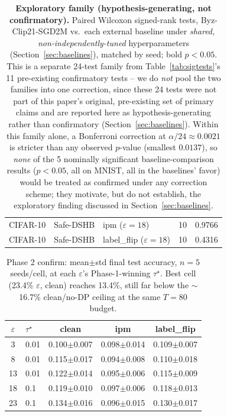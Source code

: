 \documentclass{article}
\begin{document}
\begin{table}[t]
\begin{tabular}{lllcc}
CIFAR-10 & Safe-DSHB & ipm ($\varepsilon{=}18$) & 10 & 0.9766 \\
CIFAR-10 & Safe-DSHB & label\_flip ($\varepsilon{=}18$) & 10 & 0.4316 \\
\bottomrule
\end{tabular}
\caption{\textbf{Exploratory family (hypothesis-generating, not confirmatory).}
Paired Wilcoxon signed-rank tests, Byz-Clip21-SGD2M vs.\ each external
baseline under \emph{shared, non-independently-tuned} hyperparameters
(Section~\ref{sec:baselines}), matched by seed; bold $p{<}0.05$. This is a
separate 24-test family from Table~\ref{tab:sigtests}'s 11 pre-existing
confirmatory tests -- we do \emph{not} pool the two families into one
correction, since these 24 tests were not part of this paper's original,
pre-existing set of primary claims and are reported here as
hypothesis-generating rather than confirmatory (Section~\ref{sec:baselines}).
Within this family alone, a Bonferroni correction at $\alpha/24\approx0.0021$
is stricter than any observed $p$-value (smallest $0.0137$), so \emph{none} of
the 5 nominally significant baseline-comparison results ($p<0.05$, all on
MNIST, all in the baselines' favor) would be treated as confirmed under any
correction scheme; they motivate, but do not establish, the exploratory
finding discussed in Section~\ref{sec:baselines}.}
\label{tab:sigtests-baselines}
\end{table}

\begin{table}[t]
\centering\small
\begin{tabular}{clccc}
\toprule
$\varepsilon$ & $\tau^\star$ & clean & ipm & label\_flip \\
\midrule
3  & 0.01 & 0.100$\pm$0.007 & 0.098$\pm$0.014 & 0.109$\pm$0.007 \\
8  & 0.01 & 0.115$\pm$0.017 & 0.094$\pm$0.008 & 0.110$\pm$0.018 \\
13 & 0.01 & 0.122$\pm$0.014 & 0.095$\pm$0.006 & 0.115$\pm$0.009 \\
18 & 0.1  & 0.119$\pm$0.010 & 0.097$\pm$0.006 & 0.118$\pm$0.013 \\
23 & 0.1  & 0.134$\pm$0.016 & 0.096$\pm$0.015 & 0.130$\pm$0.017 \\
\bottomrule
\end{tabular}
\caption{Phase 2 confirm: mean$\pm$std final test accuracy, $n{=}5$ seeds/cell,
at each $\varepsilon$'s Phase-1-winning $\tau^\star$. Best cell (23.4\%
$\varepsilon$, clean) reaches 13.4\%, still far below the $\sim$16.7\%
clean/no-DP ceiling at the same $T{=}80$ budget.}
\label{tab:tauconfirm}
\end{table}
\end{document}
